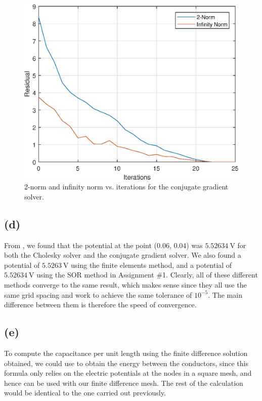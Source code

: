 \documentclass[journal,hidelinks]{IEEEtran}
\begin{document}
\begin{figure}[!htb]
  \centering
  \includegraphics[width=\columnwidth]{question-3/cg_results.eps}
  \caption{2-norm and infinity norm vs. iterations for the conjugate gradient solver.}
  \label{fig:cg_results}
\end{figure}

\subsection*{(d)}

From , we found that the potential at the point (0.06, 0.04) was $\SI{5.52634}{\volt}$ for both the Cholesky solver and the conjugate gradient solver. We also found a potential of $\SI{5.5263}{\volt}$ using the finite elements method, and a potential of $\SI{5.52634}{\volt}$ using the SOR method in Assignment \#1. Clearly, all of these different methods converge to the same result, which makes sense since they all use the same grid spacing and work to achieve the same tolerance of $10^{-5}$. The main difference between them is therefore the speed of convergence.

\subsection*{(e)}

To compute the capacitance per unit length using the finite difference solution obtained, we could use  to obtain the energy between the conductors, since this formula only relies on the electric potentials at the nodes in a square mesh, and hence can be used with our finite difference mesh. The rest of the calculation would be identical to the one carried out previously.
\end{document}
